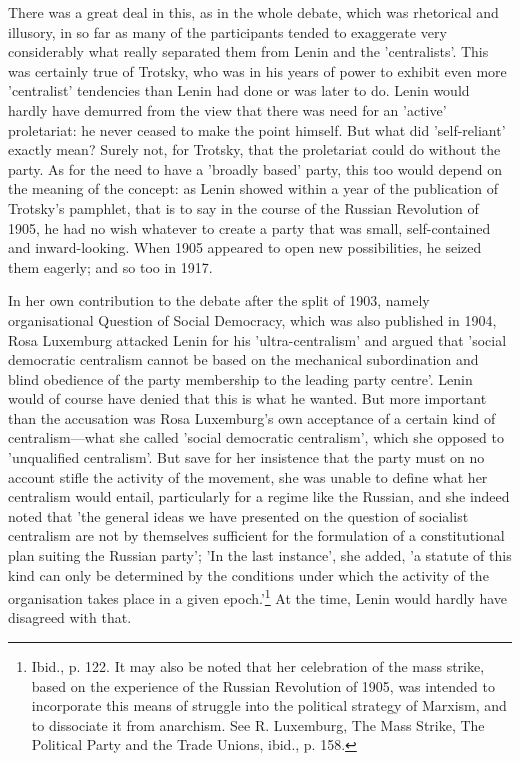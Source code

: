 There was a great deal in this, as in the whole debate, which was rhetorical and illusory, in so far as many of the participants tended to exaggerate very considerably what really separated them from Lenin and the 'centralists'. This was certainly true of Trotsky, who was in his years of power to exhibit even more 'centralist' tendencies than Lenin had done or was later to do. Lenin would hardly have demurred from the view that there was need for an 'active' proletariat: he never ceased to make the point himself. But what did 'self-reliant' exactly mean? Surely not, for  Trotsky, that the proletariat could do without the party. As for the need to have a 'broadly based' party, this too would depend on the meaning of the concept: as Lenin showed within a year of the publication of Trotsky's pamphlet, that is to say in the course of the Russian Revolution of 1905, he had no wish whatever to create a party that was small, self-contained and inward\hyp{}looking. When 1905 appeared to open new possibilities, he seized them eagerly; and so too in 1917.

In her own contribution to the debate after the split of 1903, namely organisational Question of Social Democracy, which was also published in 1904, Rosa Luxemburg attacked Lenin for his 'ultra-centralism' and argued that 'social democratic centralism cannot be based on the mechanical subordination and blind obedience of the party membership to the leading party centre'. Lenin would of course have denied that this is what he wanted. But more important than the accusation was Rosa Luxemburg's own acceptance of a certain kind of centralism—what she called 'social democratic centralism', which she opposed to 'unqualified centralism'. But save for her insistence that the party must on no account stifle the activity of the movement, she was unable to define what her centralism would entail, particularly for a regime like the Russian, and she indeed noted that 'the general ideas we have presented on the question of socialist centralism are not by themselves sufficient for the formulation of a constitutional plan suiting the Russian party'; 'In the last instance', she added, 'a statute of this kind can only be determined by the conditions under which the activity of the organisation takes place in a given epoch.'\footnote{Ibid., p. 122. It may also be noted that her celebration of the mass strike, based on the experience of the Russian Revolution of 1905, was intended to incorporate this means of struggle into the political strategy of Marxism, and to dissociate it from anarchism. See R. Luxemburg, The Mass Strike, The Political Party and the Trade Unions, ibid., p. 158.} At the time, Lenin would hardly have disagreed with that.

